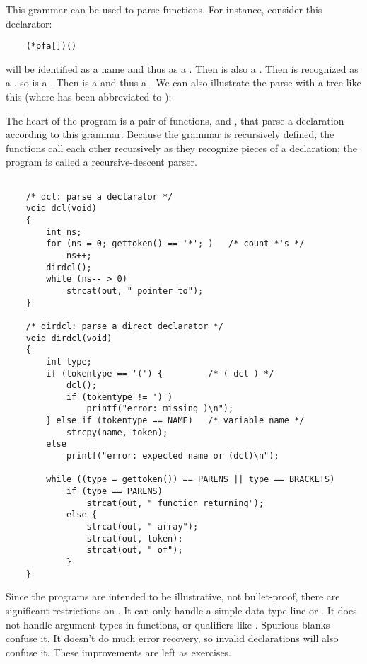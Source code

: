 This grammar can be used to parse functions. For instance, consider this declarator:
\begin{lstlisting}
    (*pfa[])()
\end{lstlisting}
 will be identified as a name and thus as a .
Then  is also a .
Then  is recognized as a , so  is a .
Then  is a  and thus a .
We can also illustrate the parse with a tree like this (where  has been abbreviated to ):

The heart of the  program is a pair of functions,  and , that parse a declaration according to this grammar.
Because the grammar is recursively defined, the functions call each other recursively as they recognize pieces of a declaration; the program is called a recursive-descent parser.
\begin{lstlisting}

    /* dcl: parse a declarator */
    void dcl(void)
    {
        int ns;
        for (ns = 0; gettoken() == '*'; )   /* count *'s */
            ns++;
        dirdcl();
        while (ns-- > 0)
            strcat(out, " pointer to");
    }

    /* dirdcl: parse a direct declarator */
    void dirdcl(void)
    {
        int type;
        if (tokentype == '(') {         /* ( dcl ) */
            dcl();
            if (tokentype != ')')
                printf("error: missing )\n");
        } else if (tokentype == NAME)   /* variable name */
            strcpy(name, token);
        else
            printf("error: expected name or (dcl)\n");

        while ((type = gettoken()) == PARENS || type == BRACKETS)
            if (type == PARENS)
                strcat(out, " function returning");
            else {
                strcat(out, " array");
                strcat(out, token);
                strcat(out, " of");
            }
    }
\end{lstlisting}

Since the programs are intended to be illustrative, not bullet-proof, there are significant restrictions on .
It can only handle a simple data type line  or .
It does not handle argument types in functions, or qualifiers like .
Spurious blanks confuse it.
It doesn't do much error recovery, so invalid declarations will also confuse it.
These improvements are left as exercises.

